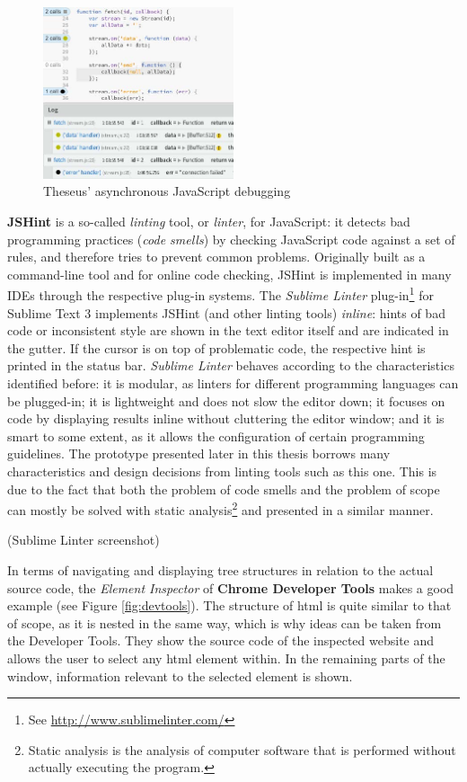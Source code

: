 \begin{figure}[htbp]
\centering
\includegraphics[keepaspectratio,width=0.5\textwidth]{img/theseus.jpg}
\caption{Theseus’ asynchronous JavaScript debugging \cite{lieber}}
\label{fig:theseus}
\end{figure}

\textbf{JSHint} is a so-called \emph{linting} tool, or \emph{linter},
for JavaScript: it detects bad programming practices (\emph{code
smells}) by checking JavaScript code against a set of rules, and
therefore tries to prevent common problems. Originally built as a
command-line tool and for online code checking, JSHint is implemented in
many IDEs through the respective plug-in systems. The \emph{Sublime
Linter} plug-in\footnote{See \url{http://www.sublimelinter.com/}} for
Sublime Text 3 implements JSHint (and other linting tools)
\emph{inline}: hints of bad code or inconsistent style are shown in the
text editor itself and are indicated in the gutter. If the cursor is on
top of problematic code, the respective hint is printed in the status
bar. \emph{Sublime Linter} behaves according to the characteristics
identified before: it is modular, as linters for different programming
languages can be plugged-in; it is lightweight and does not slow the
editor down; it focuses on code by displaying results inline without
cluttering the editor window; and it is smart to some extent, as it
allows the configuration of certain programming guidelines. The
prototype presented later in this thesis borrows many characteristics
and design decisions from linting tools such as this one. This is due to
the fact that both the problem of code smells and the problem of scope
can mostly be solved with static
analysis\footnote{Static analysis is the analysis of computer software that is performed without actually executing the program.}
and presented in a similar manner.

(Sublime Linter screenshot)

In terms of navigating and displaying tree structures in relation to the
actual source code, the \emph{Element Inspector} of \textbf{Chrome
Developer Tools} makes a good example (see Figure \ref{fig:devtools}).
The structure of \acs{html} is quite similar to that of scope, as it is
nested in the same way, which is why ideas can be taken from the
Developer Tools. They show the source code of the inspected website and
allows the user to select any \acs{html} element within. In the
remaining parts of the window, information relevant to the selected
element is shown.

